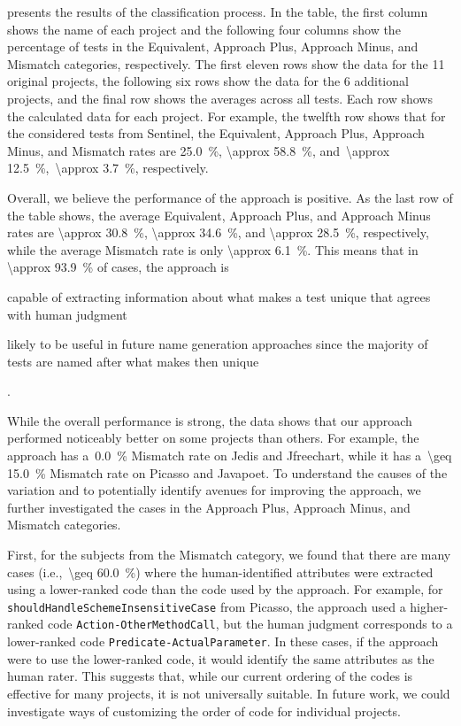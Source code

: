  presents the results of the classification process.
%
In the table, the first column shows the name of each project and the following four columns show the percentage of tests in the Equivalent, Approach Plus, Approach Minus, and Mismatch categories, respectively.
% 
The first eleven rows show the data for the \num{11} original projects, the following six rows show the data for the \num{6} additional projects, and the final row shows the averages across all tests.
%
Each row shows the calculated data for each project.
%
For example, the twelfth row shows that for the considered tests from Sentinel, the Equivalent, Approach Plus, Approach Minus, and Mismatch rates are \SI{25.0}{\percent}, \SI{\approx 58.8}{\percent}, and~\SI{\approx 12.5}{\percent},~\SI{\approx 3.7}{\percent}, respectively.


Overall, we believe the performance of the approach is positive.
%
As the last row of the table shows, the average Equivalent, Approach Plus, and Approach Minus rates are \SI{\approx 30.8}{\percent}, \SI{\approx 34.6}{\percent}, and \SI{\approx 28.5}{\percent}, respectively, while the average Mismatch rate is only \SI{\approx 6.1}{\percent}.
%
This means that in \SI{\approx 93.9}{\percent} of cases, the approach is 
\begin{enumerate*}
    \item capable of extracting information about what makes a test unique that agrees with human judgment
    \item likely to be useful in future name generation approaches since the majority of tests are named after what makes then unique
\end{enumerate*}.


While the overall performance is strong, the data shows that our approach performed noticeably better on some projects than others.
%
For example, the approach has a~\SI{0.0}{\percent} Mismatch rate on Jedis and Jfreechart, while it has a~\SI{\geq 15.0}{\percent} Mismatch rate on Picasso and Javapoet.
%
To understand the causes of the variation and to potentially identify avenues for improving the approach, we further investigated the cases in the Approach Plus, Approach Minus, and Mismatch categories.


First, for the subjects from the Mismatch category, we found that there are many cases (i.e.,~\SI{\geq 60.0}{\percent}) where the human-identified attributes were extracted using a lower-ranked code than the code used by the approach.
%
For example, for \texttt{should\-Handle\-Scheme\-Insensitive\-Case} from Picasso, the approach used a higher-ranked code \texttt{Action-Other\-Method\-Call}, but the human judgment corresponds to a lower-ranked code \texttt{Predicate-Actual\-Parameter}.
%
In these cases, if the approach were to use the lower-ranked code, it would identify the same attributes as the human rater.
%
This suggests that, while our current ordering of the codes is effective for many projects, it is not universally suitable.
%
In future work, we could investigate ways of customizing the order of code for individual projects.


